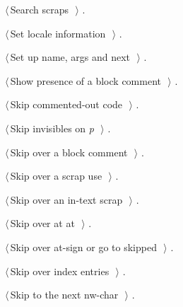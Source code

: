 \documentclass[a4paper]{report}
\begin{document}
{\begin{list}{}{\setlength{\itemsep}{-\parsep}\setlength{\itemindent}{-\leftmargin}}
{}
\item $\langle\,$Search scraps\nobreak\ {\footnotesize {}}$\,\rangle$ {\footnotesize {\NWtxtRefIn} .}
\item $\langle\,$Set locale information\nobreak\ {\footnotesize {}}$\,\rangle$ {\footnotesize {\NWtxtRefIn} .}
\item $\langle\,$Set up name, args and next\nobreak\ {\footnotesize {}}$\,\rangle$ {\footnotesize {\NWtxtRefIn} .}
\item $\langle\,$Show presence of a block comment\nobreak\ {\footnotesize {}}$\,\rangle$ {\footnotesize {\NWtxtRefIn} .}
\item $\langle\,$Skip commented-out code\nobreak\ {\footnotesize {}}$\,\rangle$ {\footnotesize {\NWtxtRefIn} .
}
\item $\langle\,$Skip invisibles on \hbox{\slshape\sffamily p\/}\nobreak\ {\footnotesize {}}$\,\rangle$ {\footnotesize {\NWtxtRefIn} .}
\item $\langle\,$Skip over a block comment\nobreak\ {\footnotesize {}}$\,\rangle$ {\footnotesize {\NWtxtRefIn} .}
\item $\langle\,$Skip over a scrap use\nobreak\ {\footnotesize {}}$\,\rangle$ {\footnotesize {\NWtxtRefIn} .}
\item $\langle\,$Skip over an in-text scrap\nobreak\ {\footnotesize {}}$\,\rangle$ {\footnotesize {\NWtxtRefIn} .}
\item $\langle\,$Skip over at at\nobreak\ {\footnotesize {}}$\,\rangle$ {\footnotesize {\NWtxtRefIn} .}
\item $\langle\,$Skip over at-sign or go to skipped\nobreak\ {\footnotesize {}}$\,\rangle$ {\footnotesize {\NWtxtRefIn} .}
\item $\langle\,$Skip over index entries\nobreak\ {\footnotesize {}}$\,\rangle$ {\footnotesize {\NWtxtRefIn} .
}
\item $\langle\,$Skip to the next nw-char\nobreak\ {\footnotesize {}}$\,\rangle$ {\footnotesize {\NWtxtRefIn} .}

\end{list}}
\end{document}
